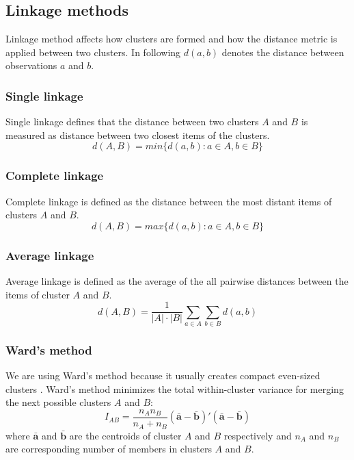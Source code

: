 

\subsection{Linkage methods}

Linkage method affects how clusters are formed and how the 
distance metric is applied between two clusters. In following 
$d(a,b)$ denotes the distance between observations $a$ and $b$.

\subsubsection{Single linkage}
Single linkage defines that the distance between two clusters $A$ 
and $B$ is measured as distance between two closest items of the 
clusters.
\begin{equation}
 d(A,B) = min\{d(a,b):a \in A, b \in B\}
\end{equation}

\subsubsection{Complete linkage}
Complete linkage is defined as the distance between the most 
distant items of clusters $A$ and $B$.
\begin{equation}
 d(A,B) = max\{d(a,b):a \in A, b \in B\}
\end{equation}

\subsubsection{Average linkage}
Average linkage is defined as the average of the all pairwise 
distances between the items of cluster $A$ and $B$.
\begin{equation}
 d(A,B) = \frac{1}{|A| \cdot |B|} \sum_{a \in A} \sum_{b \in B}d(a,b)
\end{equation}

\subsubsection{Ward's method}
We are using Ward's method because it usually creates compact 
even-sized clusters \cite{strauss_generalising_2017}. Ward's 
method minimizes the total within-cluster variance for merging 
the next possible clusters $A$ and $B$:
\begin{equation}
 I_{AB} = \frac{n_A n_B}{n_A + n_B} (\bar{\textbf{a}} - \bar{\textbf{b}})'(\bar{\textbf{a}}-\bar{\textbf{b}})
\end{equation}
where $\bar{\textbf{a}}$ and $\bar{\textbf{b}}$ are the centroids
of cluster $A$ and $B$ respectively and $n_A$ and $n_B$ are
corresponding number of members in clusters $A$ and $B$.


